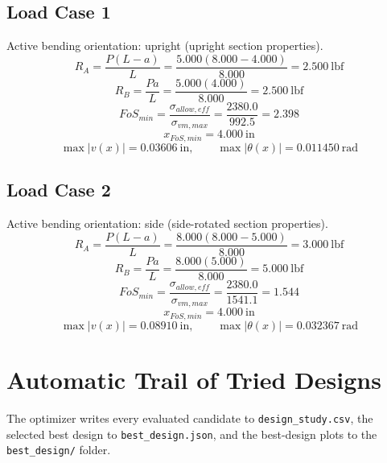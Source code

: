 \documentclass[11pt]{article}
\begin{document}
\subsection*{Load Case 1}
Active bending orientation: upright (upright section properties).
\[R_A = \frac{P(L-a)}{L} = \frac{5.000(8.000-4.000)}{8.000} = 2.500\ \mathrm{lbf}\]
\[R_B = \frac{Pa}{L} = \frac{5.000(4.000)}{8.000} = 2.500\ \mathrm{lbf}\]
\[FoS_{min} = \frac{\sigma_{allow,eff}}{\sigma_{vm,max}} = \frac{2380.0}{992.5} = 2.398\]
\[x_{FoS,min} = 4.000\ \mathrm{in}\]
\[\max |v(x)| = 0.03606\ \mathrm{in}, \qquad \max |\theta(x)| = 0.011450\ \mathrm{rad}\]
\subsection*{Load Case 2}
Active bending orientation: side (side-rotated section properties).
\[R_A = \frac{P(L-a)}{L} = \frac{8.000(8.000-5.000)}{8.000} = 3.000\ \mathrm{lbf}\]
\[R_B = \frac{Pa}{L} = \frac{8.000(5.000)}{8.000} = 5.000\ \mathrm{lbf}\]
\[FoS_{min} = \frac{\sigma_{allow,eff}}{\sigma_{vm,max}} = \frac{2380.0}{1541.1} = 1.544\]
\[x_{FoS,min} = 4.000\ \mathrm{in}\]
\[\max |v(x)| = 0.08910\ \mathrm{in}, \qquad \max |\theta(x)| = 0.032367\ \mathrm{rad}\]

\section*{Automatic Trail of Tried Designs}
The optimizer writes every evaluated candidate to \texttt{design\_study.csv}, the selected best design to \texttt{best\_design.json}, and the best-design plots to the \texttt{best\_design/} folder.
\end{document}
